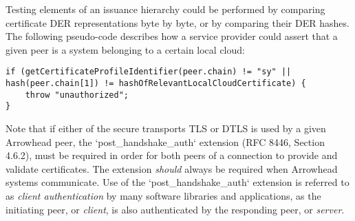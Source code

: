 Testing elements of an issuance hierarchy could be performed by comparing certificate DER representations byte by byte, or by comparing their DER hashes.
The following pseudo-code describes how a service provider could assert that a given peer is a system belonging to a certain local cloud:

\begin{verbatim}
if (getCertificateProfileIdentifier(peer.chain) != "sy" || hash(peer.chain[1]) != hashOfRelevantLocalCloudCertificate) {
    throw "unauthorized";
}
\end{verbatim}

Note that if either of the secure transports TLS or DTLS is used by a given Arrowhead peer, the `post\_handshake\_auth` extension (RFC 8446, Section 4.6.2), must be required in order for both peers of a connection to provide and validate certificates.
The extension \textit{should} always be required when Arrowhead systems communicate.
Use of the `post\_handshake\_auth` extension is referred to as \textit{client authentication} by many software libraries and applications, as the initiating peer, or \textit{client}, is also authenticated by the responding peer, or \textit{server}.